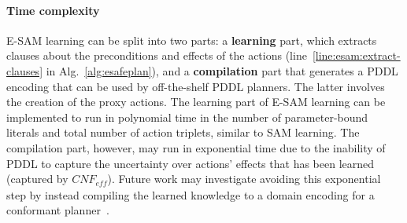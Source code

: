 \documentclass{article}
\newcommand{\params}{\textit{params}}
\newcommand{\eff}{\textit{eff}}
\newcommand{\cnf}{\textit{CNF}}
\begin{document}


      
      









\paragraph{Time complexity}
E-SAM learning can be split into two parts: a \textbf{learning} part, which extracts clauses about the preconditions and effects of the actions (line~\ref{line:esam:extract-clauses} in Alg.~\ref{alg:esafeplan}), and a \textbf{compilation} part that generates a PDDL encoding that can be used by off-the-shelf PDDL planners. The latter involves the creation of the proxy actions. 
The learning part of E-SAM learning can be implemented to run in polynomial time in the number of parameter-bound literals and total number of action triplets, similar to SAM learning. 
The compilation part, however, may run in exponential time due to the 
 inability of PDDL to capture the uncertainty over actions' effects that has been learned (captured by $\cnf_\eff$). 
 Future work may investigate avoiding this exponential step by instead compiling the learned knowledge to a domain encoding for a conformant planner~\cite{bonet2010conformant}. 
\end{document}
